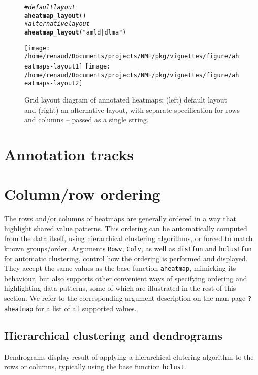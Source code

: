\documentclass[a4paper]{article}\usepackage[]{graphicx}\usepackage[]{color}
\makeatletter
\newcommand{\hlstr}[1]{\textcolor[rgb]{0.192,0.494,0.8}{#1}}%
\newcommand{\hlcom}[1]{\textcolor[rgb]{0.678,0.584,0.686}{\textit{#1}}}%
\newcommand{\hlstd}[1]{\textcolor[rgb]{0.345,0.345,0.345}{#1}}%
\newcommand{\hlkwd}[1]{\textcolor[rgb]{0.737,0.353,0.396}{\textbf{#1}}}%
\newenvironment{kframe}{%
 \def\at@end@of@kframe{}%
 \ifinner\ifhmode%
  \def\at@end@of@kframe{\end{minipage}}%
  \begin{minipage}{\columnwidth}%
 \fi\fi%
 \def\FrameCommand##1{\hskip\@totalleftmargin \hskip-\fboxsep
 \colorbox{shadecolor}{##1}\hskip-\fboxsep
     \hskip-\linewidth \hskip-\@totalleftmargin \hskip\columnwidth}%
 \MakeFramed {\advance\hsize-\width
   \@totalleftmargin\z@ \linewidth\hsize
   \@setminipage}}%
 {\par\unskip\endMakeFramed%
 \at@end@of@kframe}
\newenvironment{knitrout}{}{} %
\let\code=\texttt
\makeatother
\begin{document}
\begin{figure}[!htpb]
\begin{knitrout}\small
{}\color{fgcolor}\begin{kframe}
\begin{alltt}
\hlcom{# default layout}
\hlkwd{aheatmap_layout}\hlstd{()}
\hlcom{# alternative layout}
\hlkwd{aheatmap_layout}\hlstd{(}\hlstr{"amld | dlma"}\hlstd{)}
\end{alltt}
\end{kframe}
\texttt{[image: /home/renaud/Documents/projects/NMF/pkg/vignettes/figure/aheatmaps-layout1]} 
\texttt{[image: /home/renaud/Documents/projects/NMF/pkg/vignettes/figure/aheatmaps-layout2]} 

\end{knitrout}
\caption{Grid layout diagram of annotated heatmaps: (left) default layout and
(right) an alternative layout, with separate specification for rows
and columns -- passed as a single string.}
\label{fig:layout}
\end{figure}

\section{Annotation tracks}

\section{Column/row ordering}

The rows and/or columns of heatmaps are generally ordered in a way that
highlight shared value patterns.
This ordering can be automatically computed from the data itself, using
hierarchical clustering algorithms, or forced to match known groups/order.
Arguments \code{Rowv}, \code{Colv}, as well as \code{distfun} and
\code{hclustfun} for automatic clustering, control how the ordering is
performed and displayed.
They accept the same values as the base function \code{aheatmap}, mimicking its
behaviour, but also supports other convenient ways of specifying ordering and
highlighting data patterns, some of which are illustrated in the rest of this
section.
We refer to the corresponding argument description on the man page
\code{?aheatmap} for a list of all supported values.

\subsection{Hierarchical clustering and dendrograms}
Dendrograms display result of applying a hierarchical clutering
algorithm to the rows or columns, typically using the base function \code{hclust}.
\end{document}
